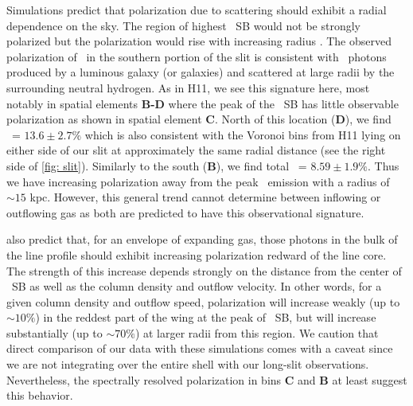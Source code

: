 Simulations predict that polarization due to scattering should exhibit a radial dependence on the sky. The region of highest \lya~SB would not be strongly polarized but the polarization would rise with increasing radius \citep{DijkstraLoeb2008}.  The observed polarization of \lya~in the southern portion of the slit is consistent with \lya~photons produced by a luminous galaxy (or galaxies) and scattered at large radii by the surrounding neutral hydrogen. As in H11, we see this signature here, most notably in spatial elements \textbf{B-D} where the peak of the \lya~SB has little observable polarization as shown in spatial element \textbf{C}. North of this location  (\textbf{D}),  we find \pol~= $13.6\pm2.7\%$ which is also consistent with the Voronoi bins from H11 lying on either side of our slit at approximately the same radial distance (see the right side of \autoref{fig: slit}).  Similarly to the south (\textbf{B}), we find total \pol~= $8.59\pm1.9\%$.  Thus we have increasing polarization away from the peak \lya~emission with a radius of $\sim15$ kpc. However, this general trend cannot determine between inflowing or outflowing gas as both are predicted to have this observational signature.

\cite{DijkstraLoeb2008} also predict that, for an envelope of expanding gas, those photons in the bulk of the line profile should exhibit increasing polarization redward of the line core. The strength of this increase depends strongly on the distance from the center of \lya~SB as well as the column density and outflow velocity. In other words, for a given column density and outflow speed, polarization will increase weakly (up to $\sim10\%$) in the reddest part of the wing at the peak of \lya~SB, but will increase substantially (up to $\sim70\%$) at larger radii from this region.  We caution that direct comparison of our data with these simulations comes with a caveat since  we are not integrating over the entire shell with our long-slit observations. Nevertheless, the spectrally resolved polarization in bins \textbf{C} and \textbf{B} at least suggest this behavior.

